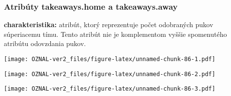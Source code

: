 \documentclass[
]{article}
\newenvironment{Shaded}{\begin{snugshade}}{\end{snugshade}}
\newcommand{\AttributeTok}[1]{\textcolor[rgb]{0.77,0.63,0.00}{#1}}
\newcommand{\FunctionTok}[1]{\textcolor[rgb]{0.00,0.00,0.00}{#1}}
\newcommand{\NormalTok}[1]{#1}
\newcommand{\SpecialCharTok}[1]{\textcolor[rgb]{0.00,0.00,0.00}{#1}}
\newcommand{\StringTok}[1]{\textcolor[rgb]{0.31,0.60,0.02}{#1}}
\begin{document}
\hypertarget{atribuxfaty-takeaways.home-a-takeaways.away}{%
\subsubsection{Atribúty takeaways.home a
takeaways.away}\label{atribuxfaty-takeaways.home-a-takeaways.away}}

\textbf{charakteristika:} atribút, ktorý reprezentuje počet odobraných
pukov súperiacemu tímu. Tento atribút nie je komplementom vyššie
spomenutého atribútu odovzdania pukov.

\begin{Shaded}
\end{Shaded}

\texttt{[image: OZNAL-ver2\_files/figure-latex/unnamed-chunk-86-1.pdf]}

\begin{Shaded}
\end{Shaded}

\texttt{[image: OZNAL-ver2\_files/figure-latex/unnamed-chunk-86-2.pdf]}

\begin{Shaded}
\end{Shaded}

\texttt{[image: OZNAL-ver2\_files/figure-latex/unnamed-chunk-86-3.pdf]}

\begin{Shaded}
\end{Shaded}
\end{document}
